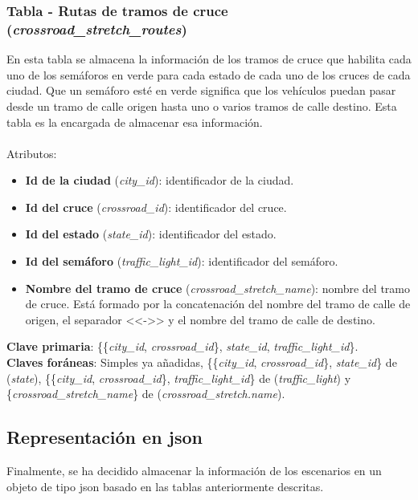 \subsubsection{Tabla - Rutas de tramos de cruce (\textit{crossroad\_stretch\_routes})}
En esta tabla se almacena la información de los tramos de cruce que habilita cada uno de los semáforos en verde para cada estado de cada uno de los cruces de cada ciudad. Que un semáforo esté en verde significa que los vehículos puedan pasar desde un tramo de calle origen hasta uno o varios tramos de calle destino. Esta tabla es la encargada de almacenar esa información. \\\\
Atributos:
\begin{itemize}
    \item \textbf{Id de la ciudad} (\textit{city\_id}): identificador de la ciudad.
    \item \textbf{Id del cruce} (\textit{crossroad\_id}): identificador del cruce.
    \item \textbf{Id del estado} (\textit{state\_id}): identificador del estado.
    \item \textbf{Id del semáforo} (\textit{traffic\_light\_id}): identificador del semáforo.
    \item \textbf{Nombre del tramo de cruce} (\textit{crossroad\_stretch\_name}): nombre del tramo de cruce. Está formado por la concatenación del nombre del tramo de calle de origen, el separador <<->> y el nombre del tramo de calle de destino.
\end{itemize}
\textbf{Clave primaria}: \{\{\textit{city\_id}, \textit{crossroad\_id}\}, \textit{state\_id}, \textit{traffic\_light\_id}\}. \\
\textbf{Claves foráneas}: Simples ya añadidas, \{\{\textit{city\_id}, \textit{crossroad\_id}\}, \textit{state\_id}\} de (\textit{state}), \{\{\textit{city\_id}, \textit{crossroad\_id}\}, \textit{traffic\_light\_id}\} de (\textit{traffic\_light}) y \newline \{\textit{crossroad\_stretch\_name}\} de (\textit{crossroad\_stretch.name}).

\subsection{Representación en \acrshort{json}}
Finalmente, se ha decidido almacenar la información de los escenarios en un objeto de tipo \acrshort{json} basado en las tablas anteriormente descritas. 

